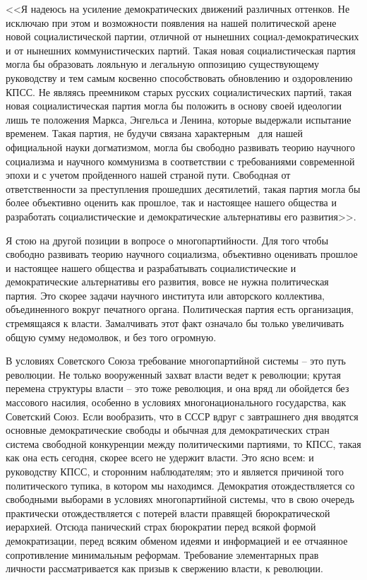 \documentclass{book}
\begin{document}
<<Я надеюсь на усиление демократических движений различ­ных оттенков. Не исключаю при этом и возможности появле­ния на нашей политической арене новой социалистической пар­тии, отличной от нынешних социал-демократических и от нынеш­них коммунистических партий. Такая новая социалистическая партия могла бы образовать лояльную и легальную оппозицию существующему руководству и тем самым косвенно способ­ствовать обновлению и оздоровлению КПСС. Не являясь преем­ником старых русских социалистических партий, такая новая социалистическая партия могла бы положить в основу своей идеологии лишь те положения Маркса, Энгельса и Ленина, ко­торые выдержали испытание временем. Такая партия, не бу­дучи связана характерным  для нашей официальной науки догматизмом, могла бы свободно развивать теорию научного социализма и научного коммунизма в соответствии с требова­ниями современной эпохи и с учетом пройденного нашей стра­ной пути. Свободная от ответственности за преступления про­шедших десятилетий, такая партия могла бы более 
объектив­но оценить как прошлое, так и настоящее нашего общества и разработать социалистические и демократические альтернативы его развития>>.%

Я стою на другой позиции в вопросе о многопартийности. Для того чтобы свободно развивать теорию научного социализ­ма, объективно оценивать прошлое и настоящее нашего общест­ва и разрабатывать социалистические и демократические альтер­нативы его развития, вовсе не нужна политическая партия. Это скорее задачи научного института или авторского коллек­тива, объединенного вокруг печатного органа. Политическая партия есть организация, стремящаяся к власти. Замалчивать этот факт означало бы только увеличивать общую сумму не­домолвок, и без того огромную.

В условиях Советского Союза требование многопартийной системы -- это путь революции. Не только вооруженный захват власти ведет к революции; крутая перемена структуры вла­сти -- это тоже революция, и она вряд ли обойдется без массо­вого насилия, особенно в условиях многонационального госу­дарства, как Советский Союз. Если вообразить, что в СССР вдруг с завтрашнего дня вводятся основные демократические свободы и обычная для демократических стран система сво­бодной конкуренции между политическими партиями, то КПСС, такая как она есть сегодня, скорее всего не удержит власти. Это ясно всем: и руководству КПСС, и сторонним наблюдате­лям; это и является причиной того политического тупика, в котором мы находимся. Демократия отождествляется со сво­бодными выборами в условиях многопартийной системы, что в свою очередь практически отождествляется с потерей влас­ти правящей бюрократической иерархией. Отсюда панический страх бюрократии перед всякой формой демократизации, перед всяким обменом идеями и информацией и ее 
отчаянное сопро­тивление минимальным реформам. Требование элементарных прав личности рассматривается как призыв к свержению вла­сти, к революции.
\end{document}
